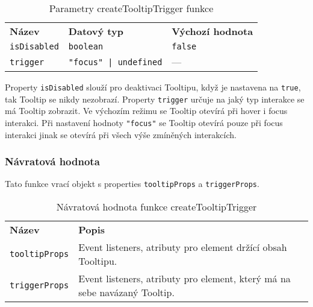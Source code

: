 \begin{table}[ht]
    \begin{ctucolortab}
        \begin{tabularx}{\textwidth}{X X X}
            \bfseries Název     & \bfseries Datový typ         & \bfseries Výchozí hodnota \\\Midrule{}
            \texttt{isDisabled} & \texttt{boolean}             & \texttt{false}            \\
            \texttt{trigger}    & \texttt{"focus" | undefined} & ---
        \end{tabularx}
    \end{ctucolortab}
    \caption{Parametry createTooltipTrigger funkce}
    \label{table:tooltip-trigger-params}
\end{table}

Property \texttt{isDisabled} slouží pro deaktivaci Tooltipu, když je nastavena na \texttt{true}, tak Tooltip se nikdy nezobrazí.
Property \texttt{trigger} určuje na jaký typ interakce se má Tooltip zobrazit.
Ve výchozím režimu se Tooltip otevírá při hover i focus interakci.
Při nastavení hodnoty \texttt{"focus"} se Tooltip otevírá pouze při focus interakci jinak se otevírá při všech výše zmíněných interakcích.

\subsubsection{Návratová hodnota}

Tato funkce vrací objekt s properties \texttt{tooltipProps} a \texttt{triggerProps}.

\begin{table}[ht]
    \begin{ctucolortab}
        \begin{tabularx}{\textwidth}{p{3cm} X}
            \bfseries Název       & \bfseries Popis                                                           \\\Midrule{}
            \texttt{tooltipProps} & Event listeners, atributy pro element držící obsah Tooltipu.              \\
            \texttt{triggerProps} & Event listeners, atributy pro element, který má na sebe navázaný Tooltip. \\
        \end{tabularx}
    \end{ctucolortab}
    \caption{Návratová hodnota funkce createTooltipTrigger}
    \label{table:tooltip-trigger-return}
\end{table}

